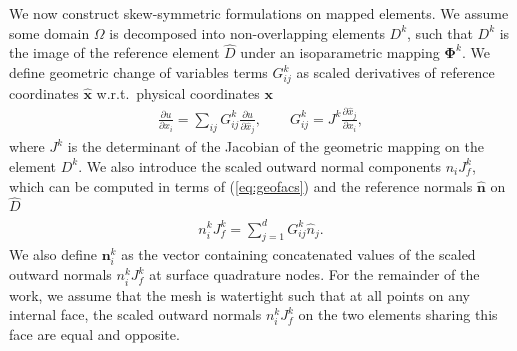 \documentclass[review]{siamart0216}
\theoremstyle{assumption}
\renewcommand{\hat}[1]{\hat{#1}}
\newcommand{\pd}[2]{\frac{\partial#1}{\partial#2}}
\renewcommand{\hat}{\widehat}
\begin{document}
We now construct skew-symmetric formulations on mapped elements.  We assume some domain $\Omega$ is decomposed into non-overlapping elements $D^k$, such that $D^k$ is the image of the reference element $\hat{D}$ under an isoparametric mapping $\bm{\Phi}^k$.  We define geometric change of variables terms ${G}^k_{ij}$ as scaled derivatives of reference coordinates $\hat{\bm{x}}$ w.r.t.\ physical coordinates $\bm{x}$
\begin{gather}
\pd{u}{x_i} = \sum_{ij} {G}^k_{ij}\pd{u}{\hat{x}_j}, \qquad {G}^k_{ij} = J^k\pd{\hat{x}_j}{{x}_i}, 
\label{eq:geofacs}
\end{gather}
where $J^k$ is the determinant of the Jacobian of the geometric mapping on the element $D^k$.  We also introduce the scaled outward normal components $n_iJ^k_f$, which can be computed in terms of (\ref{eq:geofacs}) and the reference normals $\hat{\bm{n}}$ on $\hat{D}$
\begin{gather}
n^k_i J^k_f = \sum_{j=1}^d G^k_{ij} \hat{{n}}_j.  
\label{eq:normals}
\end{gather}
We also define $\bm{n}^k_i$ as the vector containing concatenated values of the scaled outward normals $n^k_iJ^k_f$ at surface quadrature nodes.  For the remainder of the work, we assume that the mesh is watertight \cite{chan2018discretely} such that at all points on any internal face, the scaled outward normals $n^k_iJ^k_f$ on the two elements sharing this face are equal and opposite.  

\end{document}
